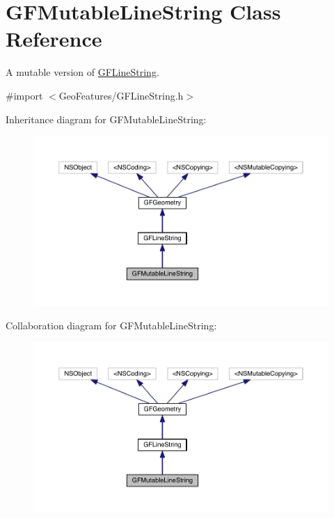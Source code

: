 \hypertarget{interface_g_f_mutable_line_string}{}\section{G\+F\+Mutable\+Line\+String Class Reference}
\label{interface_g_f_mutable_line_string}


A mutable version of \hyperlink{interface_g_f_line_string}{G\+F\+Line\+String}.  




{\ttfamily \#import $<$Geo\+Features/\+G\+F\+Line\+String.\+h$>$}



Inheritance diagram for G\+F\+Mutable\+Line\+String\+:\nopagebreak
\begin{figure}[H]
\begin{center}
\leavevmode
\includegraphics[width=350pt]{interface_g_f_mutable_line_string__inherit__graph}
\end{center}
\end{figure}


Collaboration diagram for G\+F\+Mutable\+Line\+String\+:\nopagebreak
\begin{figure}[H]
\begin{center}
\leavevmode
\includegraphics[width=350pt]{interface_g_f_mutable_line_string__coll__graph}
\end{center}
\end{figure}
